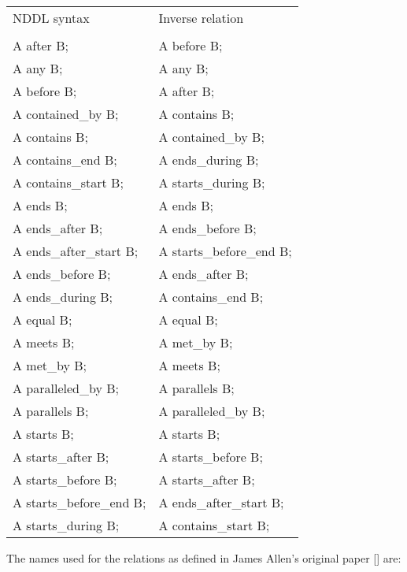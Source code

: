 \documentclass[10pt, letterpaper, twoside]{article}
\begin{document}
{\begin{tabular}{ll}
NDDL syntax & Inverse relation \\
\cline{1-2} \\
A after B; & A before B; \\
A any B; & A any B; \\
A before B; & A after B; \\
A contained\_by B; & A contains B; \\
A contains B; & A contained\_by B; \\
A contains\_end B; & A ends\_during B; \\
A contains\_start B; & A starts\_during B; \\
A ends B; & A ends B; \\
A ends\_after B; & A ends\_before B; \\
A ends\_after\_start B; & A starts\_before\_end B; \\
A ends\_before B; & A ends\_after B; \\
A ends\_during B; & A contains\_end B; \\
A equal B; & A equal B; \\
A meets B; & A met\_by B; \\
A met\_by B; & A meets B; \\
A paralleled\_by B; & A parallels B; \\
A parallels B; & A paralleled\_by B; \\
A starts B; & A starts B; \\
A starts\_after B; & A starts\_before B; \\
A starts\_before B; & A starts\_after B; \\
A starts\_before\_end B; & A ends\_after\_start B; \\
A starts\_during B; & A contains\_start B; \\
\end{tabular}

The names used for the relations as defined in James Allen's original
paper [] are:

}
\end{document}
